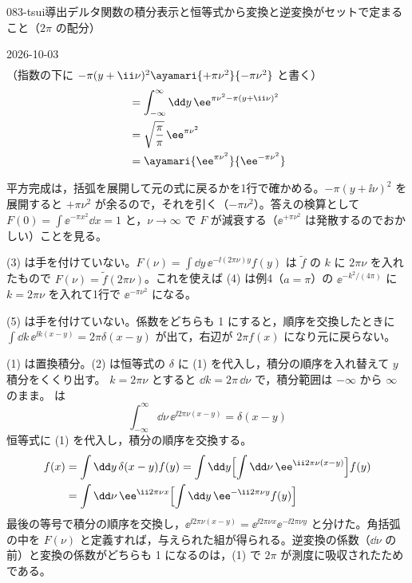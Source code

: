 \documentclass[uplatex,dvipdfmx,a4paper,11pt]{jsarticle}
\begin{document}
\begin{mondai}{083-tsui}{導出}{デルタ関数の積分表示と恒等式から変換と逆変換がセットで定まること（$2\pi$ の配分）}
\begin{kotaeutsushi}{2026-10-03}
\begin{align*}
\end{align*}
（指数の下に $-\pi(y+\ii\nu)^{2}\ayamari{+\pi\nu^{2}}{-\pi\nu^{2}}$ と書く）
\begin{align*}
  &=\int_{-\infty}^{\infty}\dd y\,\ee^{\pi\nu^{2}-\pi(y+\ii\nu)^{2}}\\
  &=\sqrt{\frac{\pi}{\pi}}\,\ee^{\pi\nu^{2}}\\
  &=\ayamari{\ee^{\pi\nu^{2}}}{\ee^{-\pi\nu^{2}}}
\end{align*}
\mikai
\end{kotaeutsushi}
\begin{kizuki}
\item 平方完成は，括弧を展開して元の式に戻るかを1行で確かめる。$-\pi(y+\ii\nu)^{2}$ を展開すると $+\pi\nu^{2}$ が余るので，それを引く（$-\pi\nu^{2}$）。答えの検算として $F(0)=\int\ee^{-\pi x^{2}}\dd x=1$ と，$\nu\to\infty$ で $F$ が減衰する（$\ee^{+\pi\nu^{2}}$ は発散するのでおかしい）ことを見る。
\item (3) は手を付けていない。$F(\nu)=\int\dd y\,\ee^{-\ii(2\pi\nu)y}f(y)$ は $\tilde f$ の $k$ に $2\pi\nu$ を入れたもので $F(\nu)=\tilde f(2\pi\nu)$。これを使えば (4) は例4（$a=\pi$）の $\ee^{-k^{2}/(4\pi)}$ に $k=2\pi\nu$ を入れて1行で $\ee^{-\pi\nu^{2}}$ になる。
\item (5) は手を付けていない。係数をどちらも 1 にすると，順序を交換したときに $\int\dd k\,\ee^{\ii k(x-y)}=2\pi\delta(x-y)$ が出て，右辺が $2\pi f(x)$ になり元に戻らない。
\end{kizuki}
\begin{tadashii}
\houshin (1) は置換積分。(2) は恒等式の $\delta$ に (1) を代入し，積分の順序を入れ替えて $y$ 積分をくくり出す。
\keisan
{} $k=2\pi\nu$ とすると $\dd k=2\pi\,\dd\nu$ で，積分範囲は $-\infty$ から $\infty$ のまま。 は
\[ \int_{-\infty}^{\infty}\dd\nu\,\ee^{\ii2\pi\nu(x-y)}=\delta(x-y) \]
 恒等式に (1) を代入し，積分の順序を交換する。
\begin{align*}
  f(x)&=\int\dd y\,\delta(x-y)f(y)=\int\dd y\Bigl[\int\dd\nu\,\ee^{\ii2\pi\nu(x-y)}\Bigr]f(y)\\
  &=\int\dd\nu\,\ee^{\ii2\pi\nu x}\Bigl[\int\dd y\,\ee^{-\ii2\pi\nu y}f(y)\Bigr]
\end{align*}
最後の等号で積分の順序を交換し，$\ee^{\ii2\pi\nu(x-y)}=\ee^{\ii2\pi\nu x}\ee^{-\ii2\pi\nu y}$ と分けた。角括弧の中を $F(\nu)$ と定義すれば，与えられた組が得られる。逆変換の係数（$\dd\nu$ の前）と変換の係数がどちらも 1 になるのは，(1) で $2\pi$ が測度に吸収されたためである。

\end{tadashii}
\end{mondai}
\end{document}
